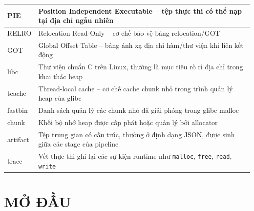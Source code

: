 \documentclass[final]{hcmuitthesis}
\begin{document}
\begin{longtable}{|p{3cm}|p{10.5cm}|}
PIE & Position Independent Executable -- tệp thực thi có thể nạp tại địa chỉ ngẫu nhiên \\ \hline
RELRO & Relocation Read-Only -- cơ chế bảo vệ bảng relocation/GOT \\ \hline
GOT & Global Offset Table -- bảng ánh xạ địa chỉ hàm/thư viện khi liên kết động \\ \hline
libc & Thư viện chuẩn C trên Linux, thường là mục tiêu rò rỉ địa chỉ trong khai thác heap \\ \hline
tcache & Thread-local cache -- cơ chế cache chunk nhỏ trong trình quản lý heap của glibc \\ \hline
fastbin & Danh sách quản lý các chunk nhỏ đã giải phóng trong glibc malloc \\ \hline
chunk & Khối bộ nhớ heap được cấp phát hoặc quản lý bởi allocator \\ \hline
artifact & Tệp trung gian có cấu trúc, thường ở định dạng JSON, được sinh giữa các stage của pipeline \\ \hline
trace & Vết thực thi ghi lại các sự kiện runtime như \texttt{malloc}, \texttt{free}, \texttt{read}, \texttt{write} \\ \hline
\end{longtable}
\endgroup

\clearpage

\listoffigures
{}

\clearpage

\listoftables
{}

\clearpage

\lstlistoflistings

\clearpage

\cleardoublepage
{}

\chapter*{MỞ ĐẦU}
\end{document}
